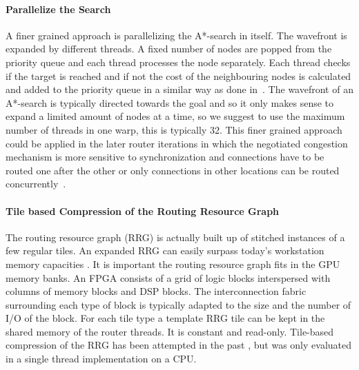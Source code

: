 \documentclass[a4paper,oneside,12pt]{article}
\begin{document}
\paragraph{Parallelize the Search}
A finer grained approach is parallelizing the A*-search in itself. The wavefront is expanded by different threads. A fixed number of nodes are popped from the priority queue and each thread processes the node separately. Each thread checks if the target is reached and if not the cost of the neighbouring nodes is calculated and added to the priority queue in a similar way as done in~\cite{Merrill2015}. The wavefront of an A*-search is typically directed towards the goal and so it only makes sense to expand a limited amount of nodes at a time, so we suggest to use the maximum number of threads in one warp, this is typically 32. This finer grained approach could be applied in the later router iterations in which the negotiated congestion mechanism is more sensitive to synchronization and connections have to be routed one after the other or only connections in other locations can be routed concurrently~\cite{gort2010deterministic}.

\paragraph{Tile based Compression of the Routing Resource Graph}
The routing resource graph (RRG) is actually built up of stitched instances of a few regular tiles. An expanded RRG can easily surpass today's workstation memory capacities \cite{murray2015timing}. It is important the routing resource graph fits in the GPU memory banks.
An FPGA consists of a grid of logic blocks interspersed with columns of memory blocks and DSP blocks. The interconnection fabric surrounding each type of block is typically adapted to the size and the number of I/O of the block. For each tile type a template RRG tile can be kept in the shared memory of the router threads. It is constant and read-only.
Tile-based compression of the RRG has been attempted in the past \cite{chin2007memory}, but was only evaluated in a single thread implementation on a CPU.

\end{document}
